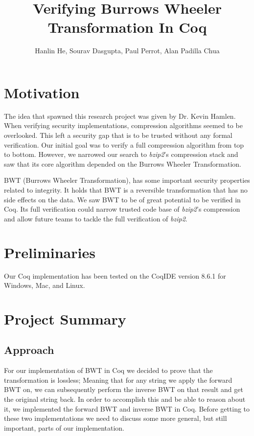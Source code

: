 \documentclass[11pt,letterpaper,titlepage]{article}
\title{Verifying Burrows Wheeler Transformation In Coq}
\author{Hanlin He, Sourav Dasgupta, Paul Perrot, Alan Padilla Chua}
\begin{document}
\maketitle

\section{Motivation}

The idea that spawned this research project was given by Dr. Kevin Hamlen. When
verifying security implementations, compression algorithms seemed to be
overlooked. This left a security gap that is to be trusted without any formal
verification. Our initial goal was to verify a full compression algorithm from
top to bottom. However, we narrowed our search to \emph{bzip2}'s compression
stack and saw that its core algorithm depended on the Burrows Wheeler
Transformation\cite{}.

BWT (Burrows Wheeler Transformation), has some important security properties
related to integrity. It holds that BWT is a reversible transformation that has
no side effects on the data. We saw BWT to be of great potential to be verified
in Coq. Its full verification could narrow trusted code base of \emph{bzip2}'s
compression and allow future teams to tackle the full verification of
\emph{bzip2}.

\section{Preliminaries}

Our Coq implementation has been tested on the CoqIDE version 8.6.1 for Windows,
Mac, and Linux.

\section{Project Summary}

\subsection{Approach}

For our implementation of BWT in Coq we decided to prove that the
transformation is lossless; Meaning that for any string we apply the forward
BWT on, we can subsequently perform the inverse BWT on that result and get the
original string back. In order to accomplish this and be able to reason about
it, we implemented the forward BWT and inverse BWT in Coq. Before getting to
these two implementations we need to discuss some more general, but still
important, parts of our implementation.
\end{document}
